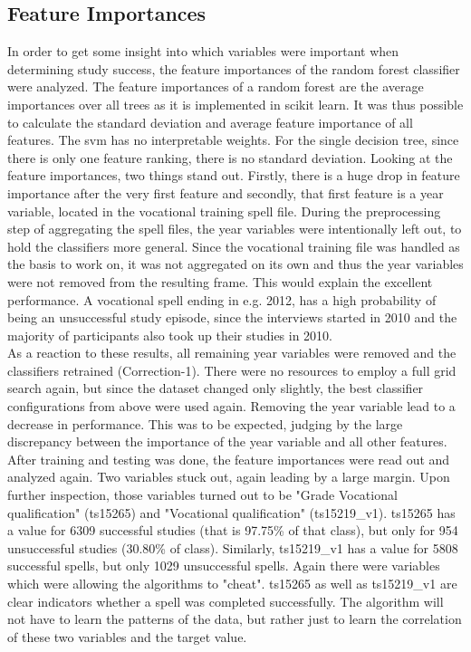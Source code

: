 \subsection{Feature Importances}
In order to get some insight into which variables were important when determining study success, the feature importances of the random forest classifier were analyzed. The feature importances of a random forest are the average importances over all trees as it is implemented in scikit learn. It was thus possible to calculate the standard deviation and average feature importance of all features. The svm has no interpretable weights. For the single decision tree, since there is only one feature ranking, there is no standard deviation. Looking at the feature importances, two things stand out. Firstly, there is a huge drop in feature importance after the very first feature and secondly, that first feature is a year variable, located in the vocational training spell file. During the preprocessing step of aggregating the spell files, the year variables were intentionally left out, to hold the classifiers more general. Since the vocational training file was handled as the basis to work on, it was not aggregated on its own and thus the year variables were not removed from the resulting frame. This would explain the excellent performance. A vocational spell ending in e.g. 2012, has a high probability of being an unsuccessful study episode, since the interviews started in 2010 and the majority of participants also took up their studies in 2010.\\
As a reaction to these results, all remaining year variables were removed and the classifiers retrained (Correction-1). There were no resources to employ a full grid search again, but since the dataset changed only slightly, the best classifier configurations from above were used again. Removing the year variable lead to a decrease in performance. This was to be expected, judging by the large discrepancy between the importance of the year variable and all other features. After training and testing was done, the feature importances were read out and analyzed again. Two variables stuck out, again leading by a large margin. Upon further inspection, those variables turned out to be "Grade Vocational qualification" (ts15265) and "Vocational qualification" (ts15219\_v1). ts15265 has a value for 6309 successful studies (that is 97.75\% of that class), but only for 954 unsuccessful studies (30.80\% of class). Similarly, ts15219\_v1 has a value for 5808 successful spells, but only 1029 unsuccessful spells. Again there were variables which were allowing the algorithms to "cheat". ts15265 as well as ts15219\_v1 are clear indicators whether a spell was completed successfully. The algorithm will not have to learn the patterns of the data, but rather just to learn the correlation of these two variables and the target value.\\
